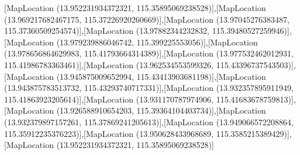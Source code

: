 [MapLocation (13.952231934372321, 115.35895069238528)],[MapLocation (13.969217682467175, 115.37226920260669)],[MapLocation (13.97045276383487, 115.37360509254574)],[MapLocation (13.97882344232832, 115.39480527259946)],[MapLocation (13.979239886046742, 115.399225553056)],[MapLocation (13.978656864629983, 115.41793664314389)],[MapLocation (13.977532462012931, 115.41986783363461)],[MapLocation (13.962534553599326, 115.43396737543503)],[MapLocation (13.945875009652994, 115.43413903681198)],[MapLocation (13.943875783513732, 115.43293740717331)],[MapLocation (13.932357895911949, 115.41863923205614)],[MapLocation (13.931170787974906, 115.41683678759813)],[MapLocation (13.926588910654203, 115.39364104403734)],[MapLocation (13.932379897157261, 115.37869241205613)],[MapLocation (13.949066572208864, 115.35912235376223)],[MapLocation (13.950628433968689, 115.3585215389429)],[MapLocation (13.952231934372321, 115.35895069238528)]